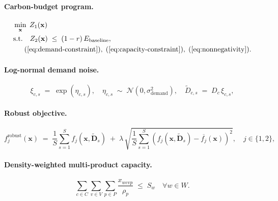 \documentclass{article}
\begin{document}
\paragraph{Carbon-budget program.}
\begin{equation}
\begin{aligned}
& \min_{\mathbf{x}} \; Z_1(\mathbf{x}) \\
& \text{s.t.} \quad
Z_2(\mathbf{x}) \;\leq\; (1 - r) \, E_{\mathrm{baseline}}, \\
& \quad\;\;
(\ref{eq:demand-constraint}), \;
(\ref{eq:capacity-constraint}), \;
(\ref{eq:nonnegativity}).
\end{aligned}
\label{eq:carbon-budget}
\end{equation}

\paragraph{Log-normal demand noise.}
\begin{equation}
\xi_{c,s} \;=\; \exp(\eta_{c,s}),
\quad \eta_{c,s} \;\sim\; \mathcal{N}(0, \sigma_{\mathrm{demand}}^2),
\quad
\widetilde{D}_{c,s} \;=\; D_c \, \xi_{c,s},
\label{eq:lognormal-noise}
\end{equation}

\paragraph{Robust objective.}
\begin{equation}
f^{\mathrm{robust}}_j(\mathbf{x})
\;=\;
\frac{1}{S} \sum_{s=1}^{S} f_j(\mathbf{x}, \widetilde{\mathbf{D}}_s)
\;+\;
\lambda \,
\sqrt{ \frac{1}{S} \sum_{s=1}^{S} \!
\left( f_j(\mathbf{x}, \widetilde{\mathbf{D}}_s)
       - \overline{f_j}(\mathbf{x}) \right)^{2} },
\quad j \in \{1, 2\},
\label{eq:robust-objective}
\end{equation}

\paragraph{Density-weighted multi-product capacity.}
\begin{equation}
\sum_{c \in C} \sum_{v \in V} \sum_{p \in P}
\frac{x_{wcvp}}{\rho_p} \;\leq\; S_w
\quad \forall w \in W.
\label{eq:density-weighted-capacity}
\end{equation}
\end{document}
